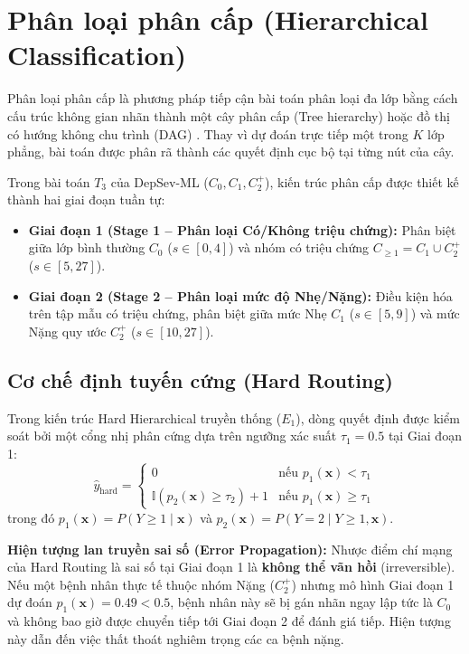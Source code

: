 \section{Phân loại phân cấp (Hierarchical Classification)}
\label{sec:ly-thuyet-hierarchical}

Phân loại phân cấp là phương pháp tiếp cận bài toán phân loại đa lớp bằng cách cấu trúc không gian nhãn thành một cây phân cấp (Tree hierarchy) hoặc đồ thị có hướng không chu trình (DAG) \cite{silla2011survey}. Thay vì dự đoán trực tiếp một trong $K$ lớp phẳng, bài toán được phân rã thành các quyết định cục bộ tại từng nút của cây.

Trong bài toán $T_3$ của DepSev-ML ($C_0, C_1, C_2^+$), kiến trúc phân cấp được thiết kế thành hai giai đoạn tuần tự:
\begin{itemize}
    \item \textbf{Giai đoạn 1 (Stage 1 -- Phân loại Có/Không triệu chứng):} Phân biệt giữa lớp bình thường $C_0$ ($s \in [0, 4]$) và nhóm có triệu chứng $C_{\ge 1} = C_1 \cup C_2^+$ ($s \in [5, 27]$).
    \item \textbf{Giai đoạn 2 (Stage 2 -- Phân loại mức độ Nhẹ/Nặng):} Điều kiện hóa trên tập mẫu có triệu chứng, phân biệt giữa mức Nhẹ $C_1$ ($s \in [5, 9]$) và mức Nặng quy ước $C_2^+$ ($s \in [10, 27]$).
\end{itemize}

\subsection{Cơ chế định tuyến cứng (Hard Routing)}
Trong kiến trúc Hard Hierarchical truyền thống ($E_1$), dòng quyết định được kiểm soát bởi một cổng nhị phân cứng dựa trên ngưỡng xác suất $\tau_1 = 0.5$ tại Giai đoạn 1:
\begin{equation}
    \hat{y}_{\text{hard}} = \begin{cases} 0 & \text{nếu } p_1(\mathbf{x}) < \tau_1 \\ \mathbb{I}(p_2(\mathbf{x}) \ge \tau_2) + 1 & \text{nếu } p_1(\mathbf{x}) \ge \tau_1 \end{cases}
\end{equation}
trong đó $p_1(\mathbf{x}) = P(Y \ge 1 \mid \mathbf{x})$ và $p_2(\mathbf{x}) = P(Y = 2 \mid Y \ge 1, \mathbf{x})$.

\textbf{Hiện tượng lan truyền sai số (Error Propagation):} Nhược điểm chí mạng của Hard Routing là sai số tại Giai đoạn 1 là \textbf{không thể vãn hồi} (irreversible). Nếu một bệnh nhân thực tế thuộc nhóm Nặng ($C_2^+$) nhưng mô hình Giai đoạn 1 dự đoán $p_1(\mathbf{x}) = 0.49 < 0.5$, bệnh nhân này sẽ bị gán nhãn ngay lập tức là $C_0$ và không bao giờ được chuyển tiếp tới Giai đoạn 2 để đánh giá tiếp. Hiện tượng này dẫn đến việc thất thoát nghiêm trọng các ca bệnh nặng.

